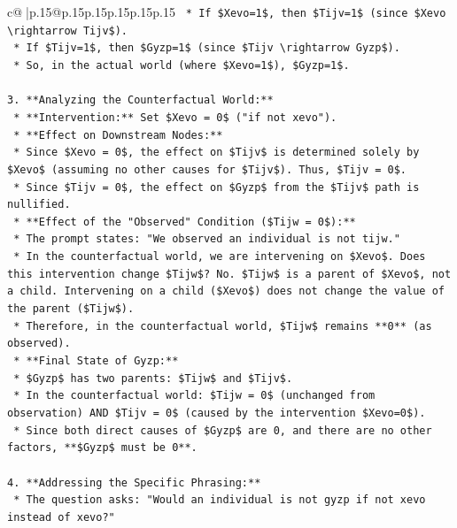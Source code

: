 \documentclass{article}
\begin{document}
{\begin{supertabular}{c@{$\;$}|p{.15\linewidth}@{}p{.15\linewidth}p{.15\linewidth}p{.15\linewidth}p{.15\linewidth}p{.15\linewidth}}
{{{\texttt{    *   If \$Xevo=1\$, then \$Tijv=1\$ (since \$Xevo \textbackslash{}rightarrow Tijv\$).} \\
\texttt{    *   If \$Tijv=1\$, then \$Gyzp=1\$ (since \$Tijv \textbackslash{}rightarrow Gyzp\$).} \\
\texttt{    *   So, in the actual world (where \$Xevo=1\$), \$Gyzp=1\$.} \\
\\ 
\texttt{3.  **Analyzing the Counterfactual World:**} \\
\texttt{    *   **Intervention:** Set \$Xevo = 0\$ ("if not xevo").} \\
\texttt{    *   **Effect on Downstream Nodes:**} \\
\texttt{        *   Since \$Xevo = 0\$, the effect on \$Tijv\$ is determined solely by \$Xevo\$ (assuming no other causes for \$Tijv\$). Thus, \$Tijv = 0\$.} \\
\texttt{        *   Since \$Tijv = 0\$, the effect on \$Gyzp\$ from the \$Tijv\$ path is nullified.} \\
\texttt{    *   **Effect of the "Observed" Condition (\$Tijw = 0\$):**} \\
\texttt{        *   The prompt states: "We observed an individual is not tijw."} \\
\texttt{        *   In the counterfactual world, we are intervening on \$Xevo\$. Does this intervention change \$Tijw\$? No. \$Tijw\$ is a parent of \$Xevo\$, not a child. Intervening on a child (\$Xevo\$) does not change the value of the parent (\$Tijw\$).} \\
\texttt{        *   Therefore, in the counterfactual world, \$Tijw\$ remains **0** (as observed).} \\
\texttt{    *   **Final State of Gyzp:**} \\
\texttt{        *   \$Gyzp\$ has two parents: \$Tijw\$ and \$Tijv\$.} \\
\texttt{        *   In the counterfactual world: \$Tijw = 0\$ (unchanged from observation) AND \$Tijv = 0\$ (caused by the intervention \$Xevo=0\$).} \\
\texttt{        *   Since both direct causes of \$Gyzp\$ are 0, and there are no other factors, **\$Gyzp\$ must be 0**.} \\
\\ 
\texttt{4.  **Addressing the Specific Phrasing:**} \\
\texttt{    *   The question asks: "Would an individual is not gyzp if not xevo instead of xevo?"} \\
}}}
\end{supertabular}}
\end{document}
